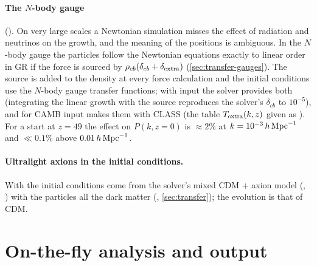 \paragraph*{The $N$-body gauge} (). On very large scales a Newtonian simulation misses the
effect of radiation and neutrinos on the growth, and the meaning of the positions is ambiguous. In the $N$-body gauge
\cite{Fidler2015} the particles follow the Newtonian equations exactly to linear order in GR if the force is sourced
by $\rho_{cb}(\delta_{cb}+\delta_{\rm extra})$ (\cref{sec:transfer-gauges}). The source is added to the density at every
force calculation and the initial conditions use the $N$-body gauge transfer functions; with  input
the solver provides both (integrating the linear growth with the source reproduces the solver's $\delta_{cb}$ to
$10^{-5}$), and for CAMB input  makes them with CLASS
(the table $T_{\rm extra}(k,z)$ given as ). For a start at $z=49$
the effect on $P(k,z=0)$ is $\approx2\%$ at $k=10^{-3}\,h\,\mathrm{Mpc}^{-1}$ and $\ll0.1\%$ above $0.01\,h\,\mathrm{Mpc}^{-1}$.

\paragraph*{Ultralight axions in the initial conditions.} With  the initial conditions come
from the solver's mixed CDM + axion model (, ) with the particles
all the dark matter (, \cref{sec:transfer}); the evolution is that of CDM.

\section{On-the-fly analysis and output}\label{sec:sim-analysis}


